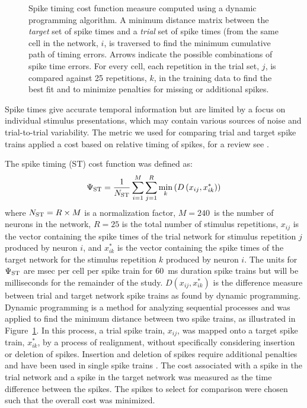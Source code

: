 \begin{figure}[t!]
 \resizebox{3in}{!}{}
 \caption[Dynamic spike-time algorithm]{Spike timing cost function measure computed using a dynamic
   programming algorithm. A minimum distance matrix between the
   \textit{target} set of spike times and a \textit{trial} set of
   spike times (from the same cell in the network, $i$, is traversed
   to find the minimum cumulative path of timing errors. Arrows
   indicate the possible combinations of spike time errors. For every
   cell, each repetition in the trial set, $j$, is compared against 25
   repetitions, $k$, in the training data to find the best fit and to
   minimize penalties for missing or additional spikes.}
\label{fig:GA:DynSpikeMetric}
\end{figure}

\smallskip{}



Spike times give accurate temporal information but are limited by a
focus on individual stimulus presentations, which may contain various
sources of noise and trial-to-trial variability. The metric we used
for comparing trial and target spike trains applied a cost based on
relative timing of spikes, for a review see \citet{Victor:2005}.

\smallskip{}

The spike timing (ST) cost function was defined as:
\begin{equation} \label{eq:GA:2} 
\Psi _{{\rm ST}} = \frac{1}{N_{{\rm ST}}
  } \sum _{i=1}^{M}\sum _{j=1}^{R}\mathop{\min}\limits_{k}
  \left(D\left(x_{ij} ,x_{ik}^{*} \right)\right)
\end{equation}
\noindent where $N_{{\rm ST}} =R\times M$ is a normalization factor,
$M=240$~is the number of neurons in the network, $R=25$ is the total
number of stimulus repetitions, $x_{ij}$ is the vector containing the
spike times of the trial network for stimulus repetition $j$ produced
by neuron $i$, and $x_{ik}^{*}$ is the vector containing the spike
times of the target network for the stimulus repetition $k$ produced
by neuron $i$.  The units for $\Psi_{{\rm ST}}$ are msec per cell per
spike train for 60~ms duration spike trains but will be milliseconds
for the remainder of the study. $D(x_{ij} ,x_{ik}^{*})$ is the
difference measure between trial and target network spike trains as
found by dynamic programming.  Dynamic programming is a method for
analyzing sequential processes \citep{Denardo:1982} and was applied to
find the minimum distance between two spike trains, as illustrated in Figure~\ref{fig:GA:DynSpikeMetric}.  In this process, a trial spike
train, $x_{ij}$, was mapped onto a target spike train, $x_{ik}^{*}$,
by a process of realignment, without specifically considering
insertion or deletion of spikes. Insertion and deletion of spikes
require additional penalties and have been used in single spike trains
\citep{VictorGoldbergEtAl:2007,Aronov:2003}.  The cost associated with
a spike in the trial network and a spike in the target network was
measured as the time difference between the spikes. The spikes to
select for comparison were chosen such that the overall cost was
minimized.

